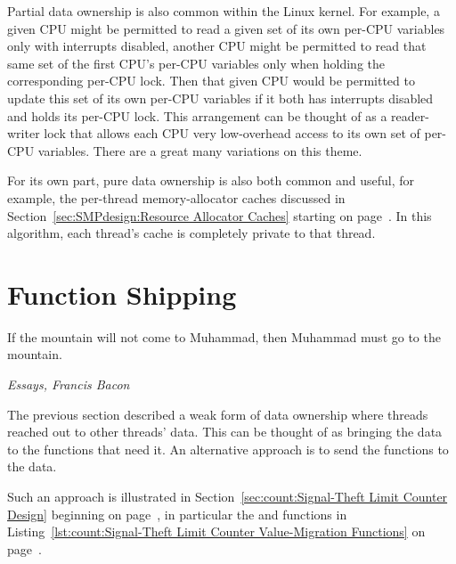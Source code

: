 \QuickQuizEnd

Partial data ownership is also common within the Linux kernel.
For example, a given CPU might be permitted to read a given set of its
own per-CPU variables only with interrupts disabled, another CPU might
be permitted to read that same set of the first CPU's per-CPU variables
only when holding the corresponding per-CPU lock.
Then that given CPU would be permitted to update this set of its own
per-CPU variables if it both has interrupts disabled and holds its
per-CPU lock.
This arrangement can be thought of as a reader-writer lock that allows
each CPU very low-overhead access to its own set of per-CPU variables.
There are a great many variations on this theme.

For its own part, pure data ownership is also both common and useful,
for example, the per-thread memory-allocator caches discussed in
Section~\ref{sec:SMPdesign:Resource Allocator Caches}
starting on
page~\pageref{sec:SMPdesign:Resource Allocator Caches}.
In this algorithm, each thread's cache is completely private to that
thread.

\section{Function Shipping}
\label{sec:owned:Function Shipping}
%
\epigraph{If the mountain will not come to Muhammad, then Muhammad must
	  go to the mountain.}
	 {\emph{Essays, Francis Bacon}}

The previous section described a weak form of data ownership where
threads reached out to other threads' data.
This can be thought of as bringing the data to the functions that
need it.
An alternative approach is to send the functions to the data.

Such an approach is illustrated in
Section~\ref{sec:count:Signal-Theft Limit Counter Design}
beginning on
page~\pageref{sec:count:Signal-Theft Limit Counter Design},
in particular the  and
 functions in
Listing~\ref{lst:count:Signal-Theft Limit Counter Value-Migration Functions}
on
page~\pageref{lst:count:Signal-Theft Limit Counter Value-Migration Functions}.

